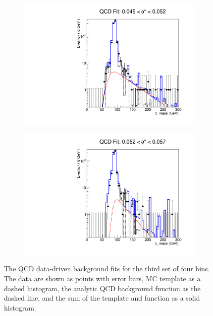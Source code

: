 \begin{figure}[!htbp]
\begin{subfigure}[b]{0.5\textwidth}
        \includegraphics[width=\linewidth]{figures/qcd_fits/qcd_fit_plot_for_11.pdf}
        \caption{}
        \label{fig:qcd_fit_11}
    \end{subfigure}%
    \begin{subfigure}[b]{0.5\textwidth}
        \includegraphics[width=\linewidth]{figures/qcd_fits/qcd_fit_plot_for_12.pdf}
        \caption{}
        \label{fig:qcd_fit_11}
    \end{subfigure}
    \caption{
       The QCD data-driven background fits for the third set of four \phistar
       bins. The data are shown as points with error bars, MC template as a
       dashed histogram, the analytic QCD background function as the dashed
       line, and the sum of the template and function as a solid histogram.
    }
    \label{fig:qcd_many_3}
\end{figure}


